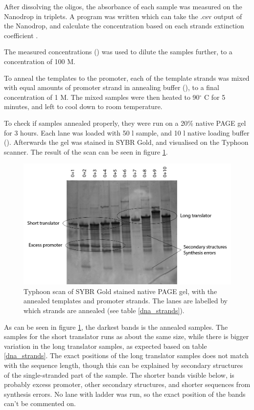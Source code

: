 After dissolving the oligos, the absorbance of each sample was measured on the Nanodrop in triplets. A program was written which can take the .csv output of the Nanodrop, and calculate the concentration based on each strands extinction coefficient \cite{nanodropimport}.

The measured concentrations () was used to dilute the samples further, to a concentration of 100 \si{\micro}M.

To anneal the templates to the promoter, each of the template strands was mixed with equal amounts of promoter strand in annealing buffer (), to a final concentration of 1 \si{\micro}M. The mixed samples were then heated to 90$^\circ$ C for 5 minutes, and left to cool down to room temperature.

To check if samples annealed properly, they were run on a 20\% native PAGE gel for 3 hours. Each lane was loaded with 50 \si{\micro}l sample, and 10 \si{\micro}l native loading buffer (). Afterwards the gel was stained in SYBR Gold, and visualised on the Typhoon scanner. The result of the scan can be seen in figure \ref{fig:promoter_annealing_gel}.

\begin{figure}
\centering
\includegraphics[width=\columnwidth]{images/promoter_annealing_gel.png}
\caption{Typhoon scan of SYBR Gold stained native PAGE gel, with the annealed templates and promoter strands. The lanes are labelled by which strands are annealed (see table \ref{dna_strands}).}
\label{fig:promoter_annealing_gel}
\end{figure}

As can be seen in figure \ref{fig:promoter_annealing_gel}, the darkest bands is the annealed samples. The samples for the short translator runs as about the same size, while there is bigger variation in the long translator samples, as expected based on table \ref{dna_strands}. The exact positions of the long translator samples does not match with the sequence length, though this can be explained by secondary structures of the single-stranded part of the sample. The shorter bands visible below, is probably excess promoter, other secondary structures, and shorter sequences from synthesis errors. No lane with ladder was run, so the exact position of the bands can't be commented on.

